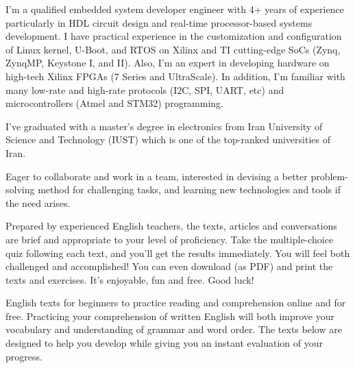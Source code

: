\documentclass[11pt, a4paper]{awesome-cv} %
\begin{document}
\makecvheader[R] %

\makelettertitle[R] %


\begin{cvletter}



I'm a qualified embedded system developer engineer with 4+ years of experience particularly in HDL circuit design and real-time processor-based systems development. I have practical experience in the customization and configuration of Linux kernel, U-Boot, and RTOS on Xilinx and TI cutting-edge SoCs (Zynq, ZynqMP, Keystone I, and II). Also, I'm an expert in developing hardware on high-tech Xilinx FPGAs (7 Series and UltraScale). In addition, I'm familiar with many low-rate and high-rate protocols (I2C, SPI, UART, etc) and microcontrollers (Atmel and STM32) programming.

I've graduated with a master's degree in electronics from Iran University of Science and Technology (IUST) which is one of the top-ranked universities of Iran.

Eager to collaborate and work in a team, interested in devising a better problem-solving method for challenging tasks, and learning new technologies and tools if the need arises.



Prepared by experienced English teachers, the texts, articles and conversations are brief and appropriate to your level of proficiency. Take the multiple-choice quiz following each text, and you'll get the results immediately. You will feel both challenged and accomplished! You can even download (as PDF) and print the texts and exercises. It's enjoyable, fun and free. Good luck!



English texts for beginners to practice reading and comprehension online and for free. Practicing your comprehension of written English will both improve your vocabulary and understanding of grammar and word order. The texts below are designed to help you develop while giving you an instant evaluation of your progress.


\end{cvletter}


\makeletterclosing %
\end{document}
